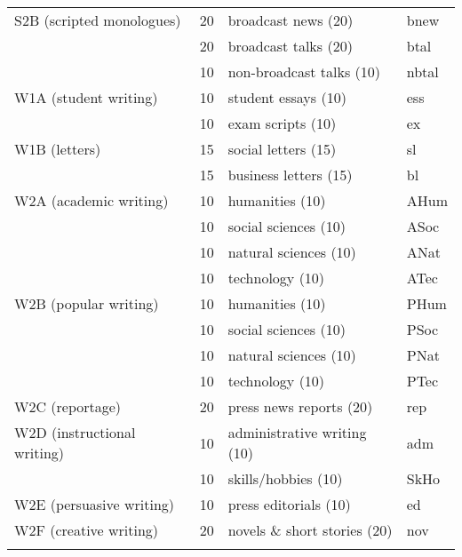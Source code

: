 \begin{table}[p]
{\begin{tabular}{lcll}
S2B (scripted monologues)    &  20        &   broadcast news (20)           & bnew        \\
                             &  20        &  broadcast talks (20)          & btal        \\
                             &  10        &  non-broadcast talks (10)      & nbtal       \\
W1A (student writing)        &  10        &  student essays (10)           & ess         \\
                             &  10        &  exam scripts (10)             & ex          \\
W1B (letters)                &  15        &  social letters (15)           & sl          \\
                             &  15        &  business letters (15)         & bl          \\
W2A (academic writing)       &  10        &  humanities (10)               & AHum        \\
                             &  10        &  social sciences (10)          & ASoc        \\
                             &  10        &  natural sciences (10)         & ANat        \\
                             &  10        &  technology (10)               & ATec        \\
W2B (popular writing)        &  10        &  humanities (10)               & PHum        \\
                             &  10        &  social sciences (10)          & PSoc        \\
                             &  10        &  natural sciences (10)         & PNat        \\
                             &  10        &  technology (10)               & PTec        \\
W2C (reportage)              &  20        &  press news reports (20)       & rep         \\
W2D (instructional writing)  &  10        &  administrative writing (10)   & adm         \\
                             &  10        &  skills/hobbies (10)           & SkHo        \\
W2E (persuasive writing)     &  10        &  press editorials (10)         & ed          \\
W2F (creative writing)       &  20        &  novels \& short stories (20)   & nov         \\
\lspbottomrule
\end{tabular}}
\end{table}

